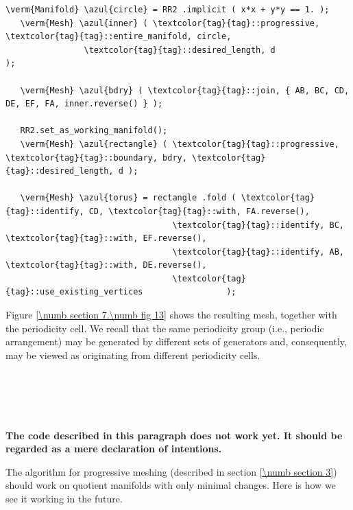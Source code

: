 \begin{Verbatim}[commandchars=\\\{\},formatcom=\small\tt,frame=single,
   label=parag-\ref{\numb section 7.\numb parag 17}.cpp,rulecolor=\color{coment},
   baselinestretch=0.94,framesep=2mm                                             ]
   \verm{Manifold} \azul{circle} = RR2 .implicit ( x*x + y*y == 1. );
   \verm{Mesh} \azul{inner} ( \textcolor{tag}{tag}::progressive, \textcolor{tag}{tag}::entire_manifold, circle,
                \textcolor{tag}{tag}::desired_length, d                         );

   \verm{Mesh} \azul{bdry} ( \textcolor{tag}{tag}::join, { AB, BC, CD, DE, EF, FA, inner.reverse() } );

   RR2.set_as_working_manifold();
   \verm{Mesh} \azul{rectangle} ( \textcolor{tag}{tag}::progressive, \textcolor{tag}{tag}::boundary, bdry, \textcolor{tag}{tag}::desired_length, d );

   \verm{Mesh} \azul{torus} = rectangle .fold ( \textcolor{tag}{tag}::identify, CD, \textcolor{tag}{tag}::with, FA.reverse(),
                                  \textcolor{tag}{tag}::identify, BC, \textcolor{tag}{tag}::with, EF.reverse(),
                                  \textcolor{tag}{tag}::identify, AB, \textcolor{tag}{tag}::with, DE.reverse(),
                                  \textcolor{tag}{tag}::use_existing_vertices                 );
\end{Verbatim}

Figure \ref{\numb section 7.\numb fig 13} shows the resulting mesh, together with the
periodicity cell.
We recall that the same periodicity group (i.e., periodic arrangement) may be generated
by different sets of generators and, consequently, may be viewed as originating
from different periodicity cells.


\section{~~}
\label{\numb section 7.\numb parag 19}

{\normalfont\bfseries The code described in this paragraph does not work yet.
It should be regarded as a mere declaration of intentions.}
\medskip
{}

The algorithm for progressive meshing (described in section \ref{\numb section 3})
should work on quotient manifolds with only minimal changes.
Here is how we see it working in the future.


